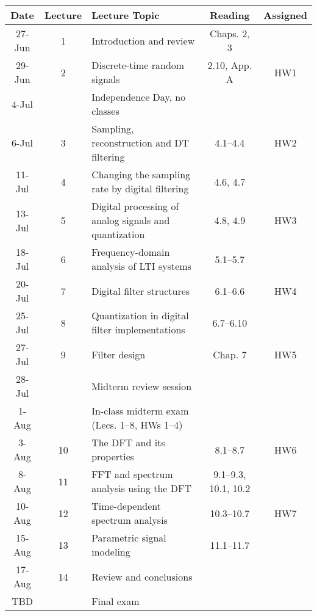 \begin{tabular}{c|c|l|c|c}
	\hline
	Date & Lecture	& Lecture Topic	& Reading\footnotemark & Assigned \\
	\hline
	27-Jun &	1	& Introduction and review	& Chaps. 2, 3	& \\
	29-Jun	& 2	& Discrete-time random signals	& 2.10, App. A & HW1 \\
	\hline
	4-Jul	&  &	Independence Day, no classes & & \\
	6-Jul	& 3 &	Sampling, reconstruction and DT filtering &	4.1--4.4 & HW2 \\
	\hline
	11-Jul	& 4 &	Changing the sampling rate by digital filtering	& 4.6, 4.7	& \\
	13-Jul	& 5	& Digital processing of analog signals and quantization & 4.8, 4.9 &	HW3 \\
	\hline
	18-Jul	& 6	& Frequency-domain analysis of LTI systems	& 5.1--5.7 & \\
	20-Jul	& 7	& Digital filter structures &	6.1--6.6	& HW4 \\
	\hline
	25-Jul	& 8	& Quantization in digital filter implementations & 6.7--6.10	& \\
	27-Jul	& 9	& Filter design & Chap. 7	& HW5 \\
	28-Jul	& 	& Midterm review session  & & \\
	\hline
	1-Aug	& &	In-class midterm exam (Lecs. 1--8, HWs 1--4) & & \\
	3-Aug	& 10 & The DFT and its properties	& 8.1--8.7	& HW6 \\
	\hline
	8-Aug	& 11 & FFT and spectrum analysis using the DFT	& 9.1--9.3, 10.1, 10.2 & \\
	10-Aug	& 12 & Time-dependent spectrum analysis & 10.3--10.7 & HW7 \\
	\hline
	15-Aug	& 13 & Parametric signal modeling 	& 11.1--11.7	& \\
	17-Aug & 14	& Review and conclusions &  & 	\\
	TBD	& & Final exam	& \\
	\hline
\end{tabular}